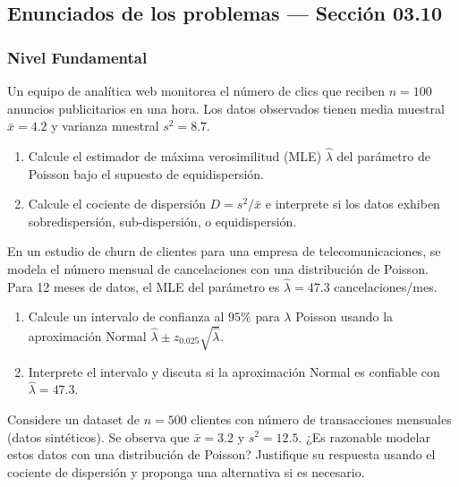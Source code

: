 
\subsection*{Enunciados de los problemas --- Sección 03.10}

\subsubsection*{Nivel Fundamental}

\begin{problema}
	\label{prob:3.10.1}
	Un equipo de analítica web monitorea el número de clics que reciben $n = 100$ anuncios publicitarios en una hora. Los datos observados tienen media muestral $\bar{x} = 4.2$ y varianza muestral $s^{2} = 8.7$.
	\begin{enumerate}
		\item Calcule el estimador de máxima verosimilitud (MLE) $\hat{\lambda}$ del parámetro de Poisson bajo el supuesto de equidispersión.
		\item Calcule el cociente de dispersión $D = s^{2}/\bar{x}$ e interprete si los datos exhiben sobredispersión, sub-dispersión, o equidispersión.
	\end{enumerate}
\end{problema}

\begin{problema}
	\label{prob:3.10.2}
	En un estudio de churn de clientes para una empresa de telecomunicaciones, se modela el número mensual de cancelaciones con una distribución de Poisson. Para 12 meses de datos, el MLE del parámetro es $\hat{\lambda} = 47.3$ cancelaciones/mes.
	\begin{enumerate}
		\item Calcule un intervalo de confianza al $95\%$ para $\lambda$ Poisson usando la aproximación Normal $\hat{\lambda} \pm z_{0.025}\sqrt{\hat{\lambda}}$.
		\item Interprete el intervalo y discuta si la aproximación Normal es confiable con $\hat{\lambda} = 47.3$.
	\end{enumerate}
\end{problema}

\begin{problema}
	\label{prob:3.10.3}
	Considere un dataset de $n = 500$ clientes con número de transacciones mensuales (datos sintéticos). Se observa que $\bar{x} = 3.2$ y $s^{2} = 12.5$. ¿Es razonable modelar estos datos con una distribución de Poisson? Justifique su respuesta usando el cociente de dispersión y proponga una alternativa si es necesario.
\end{problema}

